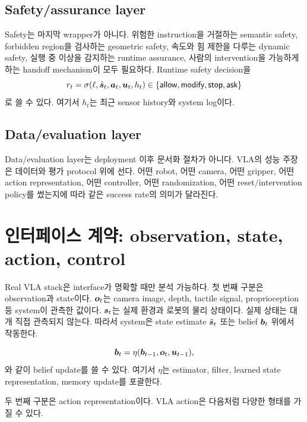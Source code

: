 \subsection{Safety/assurance layer}
Safety는 마지막 wrapper가 아니다. 위험한 instruction을 거절하는 semantic safety, forbidden region을 검사하는 geometric safety, 속도와 힘 제한을 다루는 dynamic safety, 실행 중 이상을 감지하는 runtime assurance, 사람의 intervention을 가능하게 하는 handoff mechanism이 모두 필요하다. Runtime safety decision을
\begin{equation}
  r_t = \sigma(\ell, \hat{\bm{s}}_t, \bm{a}_t, \bm{u}_t, h_t)
  \in \{\textsf{allow},\textsf{modify},\textsf{stop},\textsf{ask}\}
  \label{eq:safety-decision}
\end{equation}
로 쓸 수 있다. 여기서 $h_t$는 최근 sensor history와 system log이다.

\subsection{Data/evaluation layer}
Data/evaluation layer는 deployment 이후 문서화 절차가 아니다. VLA의 성능 주장은 데이터와 평가 protocol 위에 선다. 어떤 robot, 어떤 camera, 어떤 gripper, 어떤 action representation, 어떤 controller, 어떤 randomization, 어떤 reset/intervention policy를 썼는지에 따라 같은 success rate의 의미가 달라진다.

\section{인터페이스 계약: observation, state, action, control}

Real VLA stack은 interface가 명확할 때만 분석 가능하다. 첫 번째 구분은 observation과 state이다. $\bm{o}_t$는 camera image, depth, tactile signal, proprioception 등 system이 관측한 값이다. $\bm{s}_t$는 실제 환경과 로봇의 물리 상태이다. 실제 상태는 대개 직접 관측되지 않는다. 따라서 system은 state estimate $\hat{\bm{s}}_t$ 또는 belief $\bm{b}_t$ 위에서 작동한다.

\begin{equation}
  \bm{b}_t = \eta(\bm{b}_{t-1}, \bm{o}_t, \bm{u}_{t-1}),
  \label{eq:belief-update}
\end{equation}
와 같이 belief update를 쓸 수 있다. 여기서 $\eta$는 estimator, filter, learned state representation, memory update를 포괄한다.

두 번째 구분은 action representation이다. VLA action은 다음처럼 다양한 형태를 가질 수 있다.

